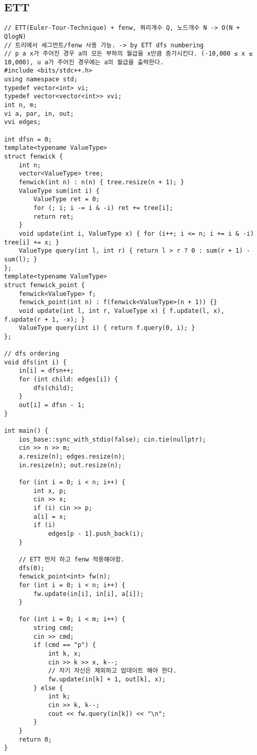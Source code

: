 \documentclass[landscape, 8pt, a4paper, oneside, twocolumn]{extarticle}
\begin{document}
    \subsection{ETT}
    \begin{verbatim}
// ETT(Euler-Tour-Technique) + fenw, 쿼리개수 Q, 노드개수 N -> O(N + QlogN)
// 트리에서 세그먼트/fenw 사용 가능. -> by ETT dfs numbering
// p a x가 주어진 경우 a의 모든 부하의 월급을 x만큼 증가시킨다. (-10,000 ≤ x ≤ 10,000), u a가 주어진 경우에는 a의 월급을 출력한다.
#include <bits/stdc++.h>
using namespace std;
typedef vector<int> vi;
typedef vector<vector<int>> vvi;
int n, m;
vi a, par, in, out;
vvi edges;

int dfsn = 0;
template<typename ValueType>
struct fenwick {
    int n;
    vector<ValueType> tree;
    fenwick(int n) : n(n) { tree.resize(n + 1); }
    ValueType sum(int i) {
        ValueType ret = 0;
        for (; i; i -= i & -i) ret += tree[i];
        return ret;
    }
    void update(int i, ValueType x) { for (i++; i <= n; i += i & -i) tree[i] += x; }
    ValueType query(int l, int r) { return l > r ? 0 : sum(r + 1) - sum(l); }
};
template<typename ValueType>
struct fenwick_point {
    fenwick<ValueType> f;
    fenwick_point(int n) : f(fenwick<ValueType>(n + 1)) {}
    void update(int l, int r, ValueType x) { f.update(l, x), f.update(r + 1, -x); }
    ValueType query(int i) { return f.query(0, i); }
};

// dfs ordering
void dfs(int i) {
    in[i] = dfsn++;
    for (int child: edges[i]) {
        dfs(child);
    }
    out[i] = dfsn - 1;
}

int main() {
    ios_base::sync_with_stdio(false); cin.tie(nullptr);
    cin >> n >> m;
    a.resize(n); edges.resize(n);
    in.resize(n); out.resize(n);

    for (int i = 0; i < n; i++) {
        int x, p;
        cin >> x;
        if (i) cin >> p;
        a[i] = x;
        if (i)
            edges[p - 1].push_back(i);
    }

    // ETT 먼저 하고 fenw 적용해야함.
    dfs(0);
    fenwick_point<int> fw(n);
    for (int i = 0; i < n; i++) {
        fw.update(in[i], in[i], a[i]);
    }

    for (int i = 0; i < m; i++) {
        string cmd;
        cin >> cmd;
        if (cmd == "p") {
            int k, x;
            cin >> k >> x, k--;
            // 자기 자신은 제외하고 업데이트 해야 한다.
            fw.update(in[k] + 1, out[k], x);
        } else {
            int k;
            cin >> k, k--;
            cout << fw.query(in[k]) << "\n";
        }
    }
    return 0;
}
    \end{verbatim}
\end{document}
